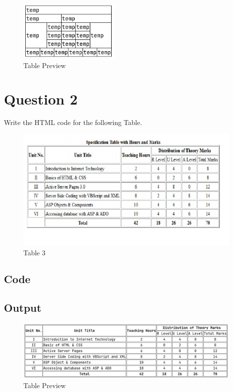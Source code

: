 \documentclass{extarticle}
\begin{document}
\begin{figure}[H]
    \caption{Table Preview}
    \centering
    \includegraphics[width=5cm]{2/2.png}
\end{figure}

\newpage
\section*{Question 2}

Write the HTML code for the following Table.

\begin{figure}[H]
    \caption{Table 3}
    \centering
    \includegraphics[width=15cm]{./img/b.jpg}
\end{figure}

\newpage
\subsection*{Code}


\newpage
\subsection*{Output}
\begin{figure}[H]
    \caption{Table Preview}
    \centering
    \includegraphics[width=16cm]{3/3.png}
\end{figure}
\end{document}
